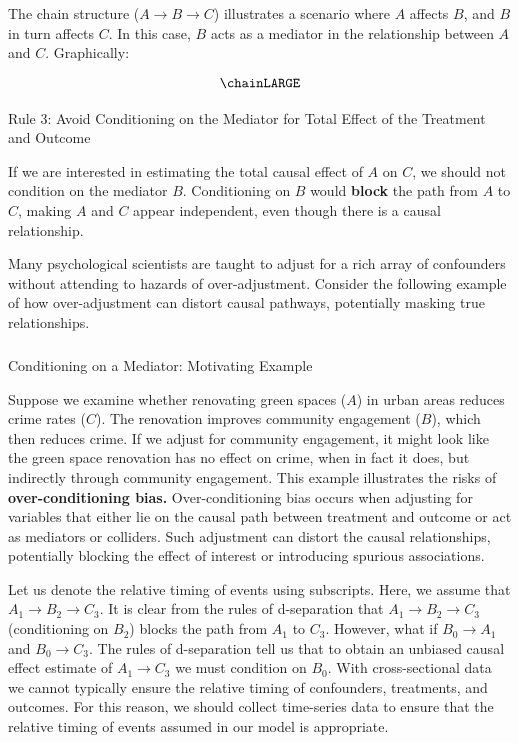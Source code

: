 \documentclass[
  singlecolumn]{article}
\makeatletter
\let\oldparagraph\paragraph
\renewcommand{\paragraph}{
    \@ifstar
      \xxxParagraphStar
      \xxxParagraphNoStar
  }
\newcommand{\xxxParagraphStar}[1]{\oldparagraph*{#1}\mbox{}}
\newcommand{\xxxParagraphNoStar}[1]{\oldparagraph{#1}\mbox{}}
\let\oldsubparagraph\subparagraph
\renewcommand{\subparagraph}{
    \@ifstar
      \xxxSubParagraphStar
      \xxxSubParagraphNoStar
  }
\newcommand{\xxxSubParagraphStar}[1]{\oldsubparagraph*{#1}\mbox{}}
\newcommand{\xxxSubParagraphNoStar}[1]{\oldsubparagraph{#1}\mbox{}}
\makeatother
\begin{document}
The chain structure (\(A \rightarrow B \rightarrow C\)) illustrates a
scenario where \(A\) affects \(B\), and \(B\) in turn affects \(C\). In
this case, \(B\) acts as a mediator in the relationship between \(A\)
and \(C\). Graphically:

\[
\chainLARGE
\]

\paragraph{Rule 3: Avoid Conditioning on the Mediator for Total Effect
of the Treatment and
Outcome}\label{rule-3-avoid-conditioning-on-the-mediator-for-total-effect-of-the-treatment-and-outcome}

If we are interested in estimating the total causal effect of \(A\) on
\(C\), we should not condition on the mediator \(B\). Conditioning on
\(B\) would \textbf{block} the path from \(A\) to \(C\), making \(A\)
and \(C\) appear independent, even though there is a causal
relationship.

Many psychological scientists are taught to adjust for a rich array of
confounders without attending to hazards of over-adjustment. Consider
the following example of how over-adjustment can distort causal
pathways, potentially masking true relationships.

\subparagraph{Conditioning on a Mediator: Motivating
Example}\label{conditioning-on-a-mediator-motivating-example}

Suppose we examine whether renovating green spaces (\(A\)) in urban
areas reduces crime rates (\(C\)). The renovation improves community
engagement (\(B\)), which then reduces crime. If we adjust for community
engagement, it might look like the green space renovation has no effect
on crime, when in fact it does, but indirectly through community
engagement. This example illustrates the risks of
\textbf{over-conditioning bias.} Over-conditioning bias occurs when
adjusting for variables that either lie on the causal path between
treatment and outcome or act as mediators or colliders. Such adjustment
can distort the causal relationships, potentially blocking the effect of
interest or introducing spurious associations.

Let us denote the relative timing of events using subscripts. Here, we
assume that \(A_1 \to B_2 \to C_3\). It is clear from the rules of
d-separation that \(A_{1} \rightarrow \boxed{B_2} \rightarrow C_{3}\)
(conditioning on \(B_2\)) blocks the path from \(A_1\) to \(C_3\).
However, what if \(B_0 \to A_1\) and \(B_0 \to C_3\). The rules of
d-separation tell us that to obtain an unbiased causal effect estimate
of \(A_1 \to C_3\) we must condition on \(B_0\). With cross-sectional
data we cannot typically ensure the relative timing of confounders,
treatments, and outcomes. For this reason, we should collect time-series
data to ensure that the relative timing of events assumed in our model
is appropriate.
\end{document}
